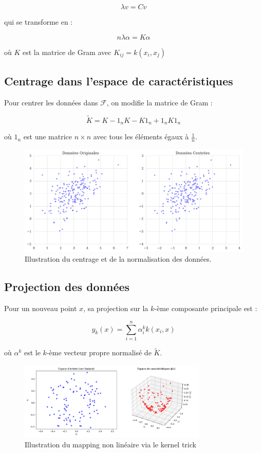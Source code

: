 \documentclass[a4paper,12pt]{report}
\begin{document}
\[
\lambda v = Cv
\]

qui se transforme en :

\[
n\lambda \alpha = K\alpha
\]

où $K$ est la matrice de Gram avec $K_{ij} = k(x_i,x_j)$
\subsection{Centrage dans l'espace de caractéristiques}

Pour centrer les données dans $\mathcal{F}$, on modifie la matrice de Gram :

\[
\tilde{K} = K - 1_n K - K 1_n + 1_n K 1_n
\]

où $1_n$ est une matrice $n \times n$ avec tous les éléments égaux à $\frac{1}{n}$.

\begin{figure}[H]
  \centering
  \includegraphics[width=1.1\textwidth]{centrage_normalisation.png}
  \caption{Illustration du centrage et de la normalisation des données.}
  \label{fig:centrage_normalisation_kernel}
\end{figure}
\subsection{Projection des données}

Pour un nouveau point $x$, sa projection sur la $k$-ème composante principale est :

\[
y_k(x) = \sum_{i=1}^n \alpha_i^k k(x_i,x)
\]

où $\alpha^k$ est le $k$-ème vecteur propre normalisé de $\tilde{K}$.

\begin{figure}[H]
  \centering
  \includegraphics[width=0.8\textwidth]{kernel_mapping.png}
  \caption{Illustration du mapping non linéaire via le kernel trick}
  \label{fig:kernel_mapping}
\end{figure}
\end{document}
